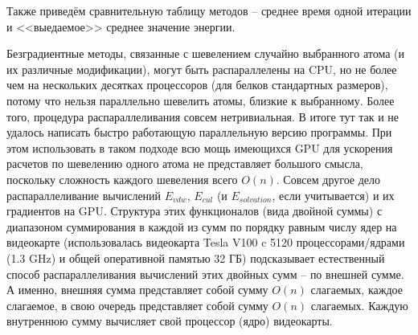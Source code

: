   Также приведём сравнительную таблицу методов -- среднее время одной итерации и <<выедаемое>> среднее значение энергии.
  \fi

  \begin{table}[h]
  	\caption{Сравнение характеристик методов}
  	\label{tabular:timesandtenses}
  	\centering
  \end{table}

  Безградиентные методы, связанные с шевелением случайно выбранного атома (и их различные модификации), могут быть распараллелены на CPU, но не более чем на нескольких десятках процессоров (для белков стандартных размеров), потому что нельзя параллельно шевелить атомы, близкие к выбранному. Более того, процедура распараллеливания совсем нетривиальная. В итоге тут так и не удалось написать быстро работающую параллельную версию программы. При этом использовать в таком подходе всю мощь имеющихся GPU для ускорения расчетов по шевелению одного атома не представляет большого смысла, поскольку сложность каждого шевеления всего ${O}\left( n \right)$. Совсем другое дело распараллеливание вычислений $E_{vdw}$, $E_{cul}$ (и $E_{solvation}$, если учитывается) и их градиентов на GPU. Структура этих функционалов (вида двойной суммы) с диапазоном суммирования в каждой из сумм по порядку равным числу ядер на видеокарте (использовалась видеокарта Tesla V100 c 5120 процессорами/ядрами (1.3 GHz) и общей оперативной памятью 32 ГБ) подсказывает естественный способ распараллеливания вычислений этих двойных сумм -- по внешней сумме. А именно, внешняя сумма представляет собой сумму ${O}\left( n \right)$ слагаемых, каждое слагаемое, в свою очередь представляет собой сумму ${O}\left( n \right)$ слагаемых. Каждую внутреннюю сумму вычисляет свой процессор (ядро) видеокарты. 

